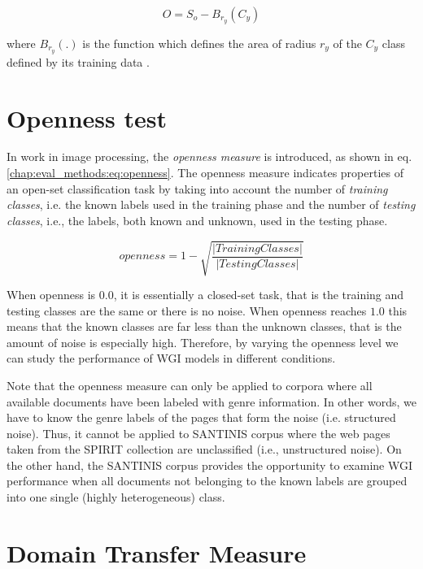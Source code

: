 {\begin{equation}\label{chap:eval_methods:eq:openspace_spherical_constrained}
	O = S_{o} - B_{r_{y}}(C_{y})
\end{equation}

\noindent
where $B_{r_{y}}(.)$ is the function which defines the area of radius $r_{y}$ of the $C_{y}$ class defined by its training data \parencite{fei2016breaking}.

\section{Openness test}\label{chap:eval_methods:sec:open_space_risk}

In \parencite{scheirer2013toward} work in image processing, the \textit{openness measure} is introduced, as shown in eq. \ref{chap:eval_methods:eq:openness}. The openness measure indicates properties of an open-set classification task by taking into account the number of \textit{training classes}, i.e. the known labels used in the training phase and the number of \textit{testing classes}, i.e., the labels, both known and unknown, used in the testing phase.

\begin{equation}\label{chap:eval_methods:eq:openness}
	openness=1-\sqrt{\frac{ | Training Classes | }{ |Testing Classes | }}
\end{equation}

When openness is $0.0$, it is essentially a closed-set task, that is the training and testing classes are the same or there is no noise. When openness reaches $1.0$ this means that the known classes are far less than the unknown classes, that is the amount of noise is especially high. Therefore, by varying the openness level we can study the performance of WGI models in different conditions.

Note that the openness measure can only be applied to corpora where all available documents have been labeled with genre information. In other words, we have to know the genre labels of the pages that form the noise (i.e. structured noise). Thus, it cannot be applied to SANTINIS corpus where the web pages taken from the SPIRIT collection are unclassified (i.e., unstructured noise). On the other hand, the SANTINIS corpus provides the opportunity to examine WGI performance when all documents not belonging to the known labels are grouped into one single (highly heterogeneous) class.



\section{Domain Transfer Measure}\label{chap:eval_methods:sec:domain_transfer_measure}

}
